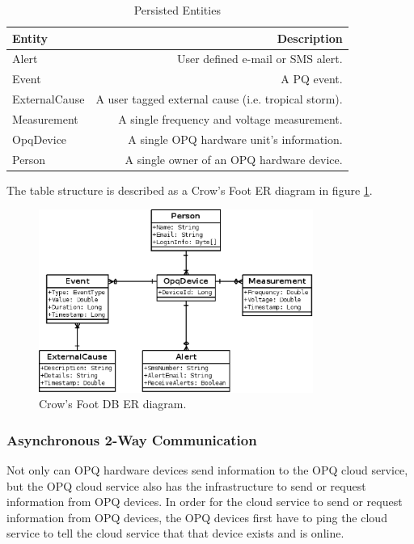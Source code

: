\documentclass[11pt]{article}
\begin{document}
\begin{table}[htbp]
	\caption{Persisted Entities}
	\label{tab:persisted_entities}
	\begin{center}
		\begin{tabular}{|l|r|}
			\hline 
			\textbf{Entity} & \textbf{Description} \\ 
			\hline 
			Alert & User defined e-mail or SMS alert. \\ 
			\hline 
			Event & A PQ event. \\ 
			\hline 
			ExternalCause & A user tagged external cause (i.e. tropical storm). \\ 
			\hline 
			Measurement & A single frequency and voltage measurement. \\ 
			\hline 
			OpqDevice & A single OPQ hardware unit's information. \\ 
			\hline 
			Person & A single owner of an OPQ hardware device. \\
		\hline
		\end{tabular} 
	\end{center}
\end{table}

The table structure is described as a Crow's Foot ER diagram in figure \ref{fig:db_er_diagram}.

\begin{figure}[htbp]
	\centering
	\includegraphics[width=0.8\textwidth]{figures/db.eps}
	\caption{Crow's Foot DB ER diagram.}
	\label{fig:db_er_diagram}
\end{figure}

\subsubsection{Asynchronous 2-Way Communication}
Not only can OPQ hardware devices send information to the OPQ cloud service, but the OPQ cloud service also has the infrastructure to send or request information from OPQ devices. In order for the cloud service to send or request information from OPQ devices, the OPQ devices first have to ping the cloud service to tell the cloud service that that device exists and is online. 
\end{document}
